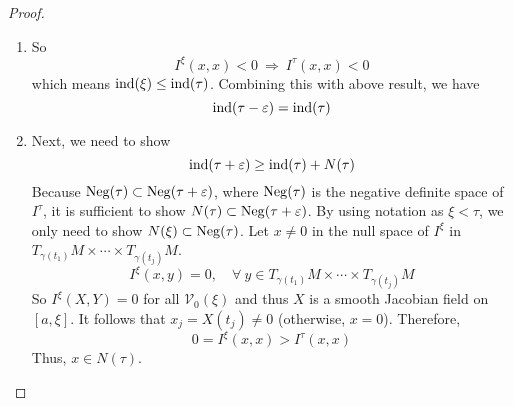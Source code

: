 \begin{enumerate}[label=\arabic{*}.]
\begin{proof}
		\begin{enumerate}[label=(\arabic{*})]
			\item So
			\begin{equation*}
				I^\xi(x,x) < 0 ~\Rightarrow~I^\tau(x,x) < 0
			\end{equation*}
			which means $\operatorname{ind}(\xi) \leq \operatorname{ind}(\tau)$. Combining this with above result, we have
			\begin{equation*}
				\operatorname{ind}(\tau - \varepsilon) = \operatorname{ind}(\tau)
			\end{equation*}

			\item Next, we need to show
			\begin{equation*}
				\operatorname{ind}(\tau + \varepsilon) \geq \operatorname{ind}(\tau) + N(\tau)
			\end{equation*}
			Because $\operatorname{Neg}(\tau) \subset \operatorname{Neg}(\tau+\varepsilon)$, where $\operatorname{Neg}(\tau)$ is the negative definite space of $I^\tau$, it is sufficient to show $N(\tau) \subset \operatorname{Neg}(\tau + \varepsilon)$. By using notation as $\xi<\tau$, we only need to show $N(\xi) \subset \operatorname{Neg}(\tau)$. Let $x \neq 0$ in the null space of $I^\xi$ in $T_{\gamma(t_1)}M \times \cdots \times T_{\gamma(t_j)}M$.
			\begin{equation*}
				I^\xi(x,y) = 0,\quad \forall~y\in T_{\gamma(t_1)}M \times \cdots \times T_{\gamma(t_j)}M
			\end{equation*}
			So $I^\xi(X,Y) = 0$ for all $\mathcal{V}_0(\xi)$ and thus $X$ is a smooth Jacobian field on $[a,\xi]$. It follows that $x_j = X(t_j) \neq 0$ (otherwise, $x = 0$). Therefore,
			\begin{equation*}
				0 = I^\xi(x,x) > I^\tau(x,x)
			\end{equation*}
			Thus, $x \in N(\tau)$. \qedhere
		\end{enumerate}
	\end{proof}
	

\end{enumerate}
